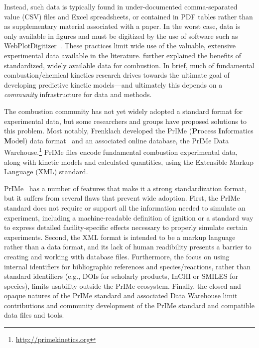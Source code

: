 \documentclass[12pt]{ijck}
\begin{document}
Instead, such data is typically found in under-documented comma-separated value
(CSV) files and Excel spreadsheets, or contained in PDF tables rather than as
supplementary material associated with a paper. In the worst case, data is only
available in figures and must be digitized by the use of software such as
WebPlotDigitizer~\autocite{WebPlotDigitizer}. These practices limit wide use
of the valuable, extensive experimental data available in the literature.
\textcite{Frenklach:2007bm} further explained the benefits of standardized,
widely available data for combustion. In brief, much of fundamental
combustion\slash chemical kinetics research drives towards the ultimate goal of
developing predictive kinetic models---and ultimately this depends on a
\emph{community} infrastructure for data and methods.

The combustion community has not yet widely adopted a standard format for
experimental data, but some researchers and groups have proposed solutions to
this problem. Most notably, Frenklach developed the PrIMe (\textbf{Pr}ocess
\textbf{I}nformatics \textbf{M}od\textbf{e}l) data
format~\autocite{Frenklach:2007bm,You:2011hy} and an associated online database,
the PrIMe Data Warehouse.\footnote{\url{http://primekinetics.org}}
PrIMe files encode fundamental
combustion experimental data, along with kinetic models and calculated
quantities, using the Extensible Markup Language (XML) standard.

PrIMe~\autocite{Frenklach:2007bm,You:2011hy} has a number of features that make
it a strong standardization format, but it suffers from several flaws that
prevent wide adoption. First, the PrIMe standard does not require or support all
the information needed to simulate an experiment, including a machine-readable
definition of ignition or a standard way to express detailed facility-specific
effects necessary to properly simulate certain experiments. Second, the XML
format is intended to be a markup language rather than a data format, and
its lack of human readibility presents a barrier to creating and working with
database files. Furthermore, the
focus on using internal identifiers for bibliographic references and
species\slash reactions, rather than standard identifiers (e.g., DOIs for
scholarly products, InCHI or SMILES for species), limits usability outside
the PrIMe ecosystem. Finally, the closed and opaque natures of the PrIMe standard
and associated Data Warehouse limit contributions and community development of
the PrIMe standard and compatible data files and tools.
\end{document}
